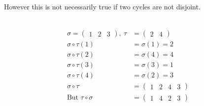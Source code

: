 
However this is not necessarily true if two cycles are not disjoint.

\begin{example} ~\vspace*{-1.5\baselineskip}
\begin{align*}
    \sigma = \begin{pmatrix}1 & 2 & 3\end{pmatrix},\ \tau &= \begin{pmatrix}2 & 4\end{pmatrix} \\
    \sigma \circ \tau(1) &= \sigma(1) = 2 \\
    \sigma \circ \tau(2) &= \sigma(4) = 4 \\
    \sigma \circ \tau(3) &= \sigma(3) = 1 \\
    \sigma \circ \tau(4) &= \sigma(2) = 3 \\
    \sigma \circ \tau &= \begin{pmatrix}1 & 2 & 4 & 3\end{pmatrix} \\
    \text{But } \tau \circ \sigma &= \begin{pmatrix} 1 & 4 & 2 & 3 \end{pmatrix}
\end{align*}
\end{example}

